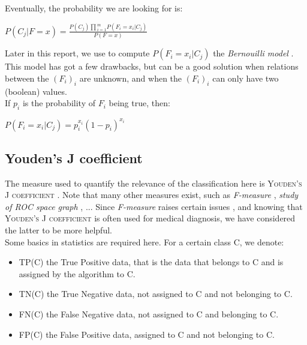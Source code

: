 \documentclass{report}
\begin{document}
Eventually, the probability we are looking for is:\\

\begin{center}
$P(C_{j} | F = x) = \frac{P(C_{j})\prod{_{i = 1}^{m}}{P(F_{i} = x_{i} | C_{j})}}{P(F = x)}$\\ 
\end{center}

Later in this report, we use to compute $P(F_{i} = x_{i} | C_{j})$ the \emph{Bernouilli model} \cite{NaiveBayes}. This model has got a few drawbacks, but can be a good solution when relations between the $(F_{i})_{i}$ are unknown, and when the $(F_{i})_{i}$ can only have two (boolean) values.\\

If $p_{i}$ is the probability of $F_{i}$ being true, then:\\
\begin{center}
$P(F_{i} = x_{i} | C_{j}) = p_{i}^{x_{i}}(1 - p_{i})^{x_{i}}$
\end{center}

\subsection{Youden's J coefficient}

The measure used to quantify the relevance of the classification here is \textsc{Youden's J coefficient} \cite{Youden}. Note that many other measures exist, such as \emph{F-measure} \cite{F-measure}, \emph{study of ROC space graph} \cite{IntroROC}, ... Since \emph{F-measure} raises certain issues \cite{FMproblems}, and knowing that \textsc{Youden's J coefficient} is often used for medical diagnosis, we have considered the latter to be more helpful.\\

Some basics in statistics are required here. For a certain class \textsc{C}, we denote:
\begin{itemize}
\item \textsc{TP(C)} the True Positive data, that is the data that belongs to \textsc{C} and is assigned by the algorithm to \textsc{C}.
\item \textsc{TN(C)} the True Negative data, not assigned to \textsc{C} and not belonging to \textsc{C}.
\item \textsc{FN(C)} the False Negative data, not assigned to \textsc{C} and belonging to \textsc{C}.
\item \textsc{FP(C)} the False Positive data, assigned to \textsc{C} and not belonging to \textsc{C}.
\end{itemize}
\end{document}
